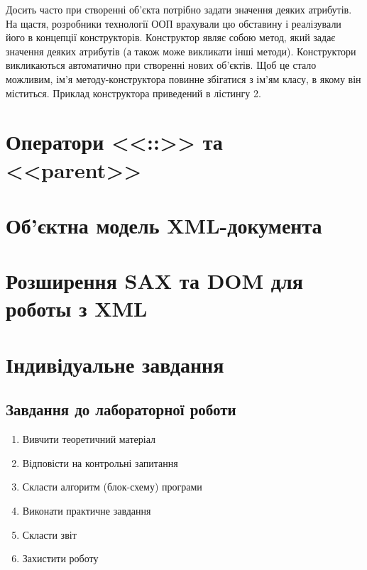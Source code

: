 Досить часто при створенні об'єкта потрібно задати значення деяких атрибутів. На щастя, розробники технології ООП врахували цю обставину і реалізували його в концепції конструкторів. Конструктор являє собою метод, який задає значення деяких атрибутів (а також може викликати інші методи). Конструктори викликаються автоматично при створенні нових об'єктів. Щоб це стало можливим, ім'я методу-конструктора повинне збігатися з ім'ям класу, в якому він міститься. Приклад конструктора приведений в лістингу 2.

\section{Оператори <<::>> та <<parent>>}


\section{Об'єктна модель XML-документа}
\section{Розширення SAX та DOM для роботы з XML}

\pagebreak[3]
\section{Індивідуальне завдання}

\nopagebreak[4]
\subsection*{Завдання до лабораторної роботи}
\nopagebreak[4]
\begin{enumerate}
\item Вивчити теоретичний матеріал
\item Відповісти на контрольні запитання
\item Скласти алгоритм (блок-схему) програми
\item Виконати практичне завдання
\item Скласти звіт
\item Захистити роботу
\end{enumerate}

